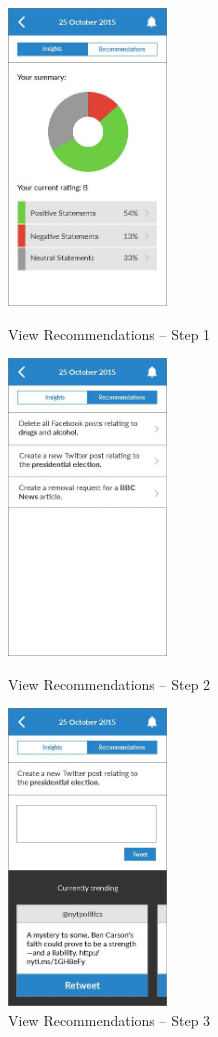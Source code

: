 \begin{figure}
  \subfigures
  \centering
  \begin{minipage}{4.6cm}
    \centering
    \includegraphics[width=4.2cm]{inc/ui_recommendation_step1.jpg}
    \caption{View Recommendations -- Step 1}
    \label{fig:ui_recommendation_step1}
  \end{minipage}
  \begin{minipage}{4.6cm}
    \centering
    \includegraphics[width=4.2cm]{inc/ui_recommendation_step2.jpg}
    \caption{View Recommendations -- Step 2}
    \label{fig:ui_recommendation_step2}
  \end{minipage}
  \begin{minipage}{4.6cm}
    \centering
    \includegraphics[width=4.2cm]{inc/ui_recommendation_step3.jpg}
    \caption{View Recommendations -- Step 3}
    \label{fig:ui_recommendation_step3}
  \end{minipage}
\end{figure}

